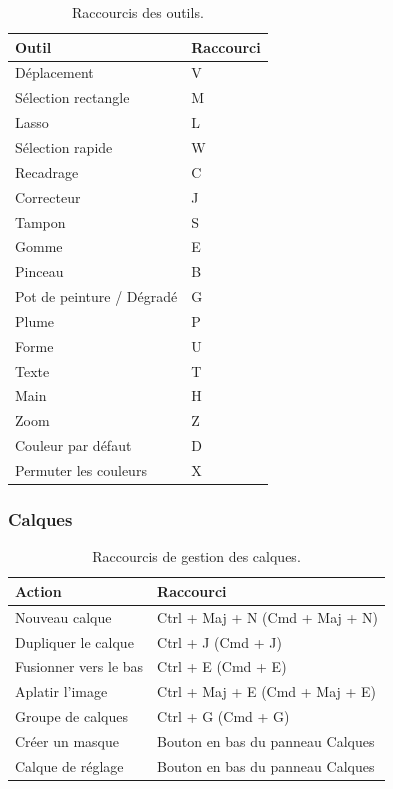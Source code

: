\begin{table}[h!]
\centering
\begin{tabular}{@{}ll@{}}
\toprule
\textbf{Outil} & \textbf{Raccourci} \\
\midrule
Déplacement & V \\
Sélection rectangle & M \\
Lasso & L \\
Sélection rapide & W \\
Recadrage & C \\
Correcteur & J \\
Tampon & S \\
Gomme & E \\
Pinceau & B \\
Pot de peinture / Dégradé & G \\
Plume & P \\
Forme & U \\
Texte & T \\
Main & H \\
Zoom & Z \\
Couleur par défaut & D \\
Permuter les couleurs & X \\
\bottomrule
\end{tabular}
\caption{Raccourcis des outils.}
\end{table}

\subsubsection{Calques}

\begin{table}[h!]
\centering
\begin{tabular}{@{}ll@{}}
\toprule
\textbf{Action} & \textbf{Raccourci} \\
\midrule
Nouveau calque & Ctrl + Maj + N (Cmd + Maj + N) \\
Dupliquer le calque & Ctrl + J (Cmd + J) \\
Fusionner vers le bas & Ctrl + E (Cmd + E) \\
Aplatir l'image & Ctrl + Maj + E (Cmd + Maj + E) \\
Groupe de calques & Ctrl + G (Cmd + G) \\
Créer un masque & Bouton en bas du panneau Calques \\
Calque de réglage & Bouton en bas du panneau Calques \\
\bottomrule
\end{tabular}
\caption{Raccourcis de gestion des calques.}
\end{table}

